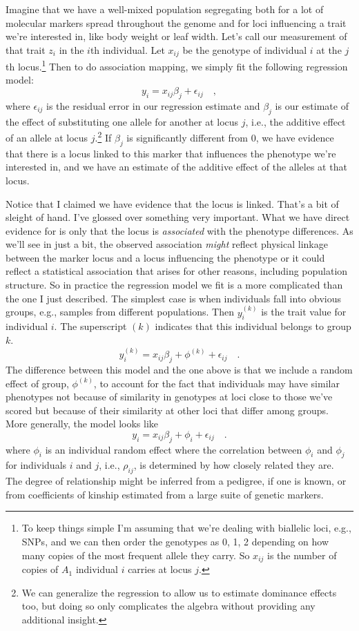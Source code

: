 Imagine that we have a well-mixed population segregating both for a
lot of molecular markers spread throughout the genome and for loci
influencing a trait we're interested in, like body weight or leaf
width. Let's call our measurement of that trait $z_i$ in the $i$th
individual. Let $x_{ij}$ be the genotype of individual $i$ at the
$j$th locus.\footnote{To keep things simple I'm assuming that we're
  dealing with biallelic loci, e.g., SNPs, and we can then order the
  genotypes as 0, 1, 2 depending on how many copies of the most
  frequent allele they carry. So $x_{ij}$ is the number of copies of
  $A_1$ individual $i$ carries at locus $j$.} Then to do association
mapping, we simply fit the following regression model:
\[
y_i = x_{ij}\beta_j + \epsilon_{ij} \quad ,
\]
where $\epsilon_{ij}$ is the residual error in our regression estimate
and $\beta_j$ is our estimate of the effect of substituting one allele
for another at locus $j$, i.e., the additive effect of an allele at
locus $j$.\footnote{We can generalize the regression to allow us to
  estimate dominance effects too, but doing so only complicates the
  algebra without providing any additional insight.} If $\beta_j$ is
significantly different from 0, we have evidence that there is a locus
linked to this marker that influences the phenotype we're interested
in, and we have an estimate of the additive effect of the alleles at
that locus.

Notice that I claimed we have evidence that the locus is
linked. That's a bit of sleight of hand. I've glossed over something
very important. What we have direct evidence for is only that the
locus is {\it associated} with the phenotype differences. As we'll see
in just a bit, the observed association {\it might\/} reflect physical
linkage between the marker locus and a locus influencing the phenotype
or it could reflect a statistical association that arises for other
reasons, including population structure. So in practice the regression
model we fit is a more complicated than the one I just described. The
simplest case is when individuals fall into obvious groups, e.g.,
samples from different populations. Then $y_i^{(k)}$ is the trait
value for individual $i$. The superscript $(k)$ indicates that this
individual belongs to group $k$.
\[
y_i^{(k)} = x_{ij}\beta_j + \phi^{(k)} + \epsilon_{ij} \quad .
\]
The difference between this model and the one above is that we include
a random effect of group, $\phi^{(k)}$, to account for the fact that
individuals may have similar phenotypes not because of similarity in
genotypes at loci close to those we've scored but because of their
similarity at other loci that differ among groups. More generally, the
model looks like
\[
y_i = x_{ij}\beta_j + \phi_i + \epsilon_{ij} \quad .
\]
where $\phi_i$ is an individual random effect where the correlation
between $\phi_i$ and $\phi_j$ for individuals $i$ and $j$, i.e.,
$\rho_{ij}$, is determined by how closely related they are. The degree
of relationship might be inferred from a pedigree, if one is known, or
from coefficients of kinship estimated from a large suite of genetic
markers.

